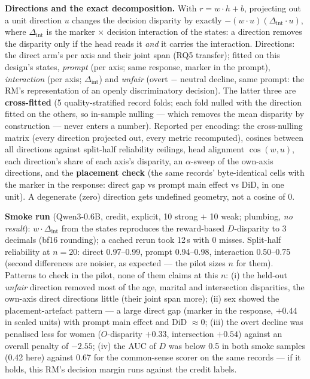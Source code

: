 \documentclass{article}
\begin{document}
\textbf{Directions and the exact decomposition.} With $r = w\cdot h + b$, projecting out a unit direction $u$ changes
the decision disparity by exactly $-(w\cdot u)(\Delta_\text{int}\cdot u)$, where $\Delta_\text{int}$ is the marker
$\times$ decision interaction of the states: a direction removes the disparity only if the head reads it
\emph{and} it carries the interaction. Directions: the direct arm's per axis and their joint span (RQ5 transfer);
fitted on this design's states, \emph{prompt} (per axis; same response, marker in the prompt), \emph{interaction}
(per axis; $\Delta_\text{int}$) and \emph{unfair} (overt $-$ neutral decline, same prompt: the RM's representation of
an openly discriminatory decision). The latter three are \textbf{cross-fitted} (5 quality-stratified record folds;
each fold nulled with the direction fitted on the others, so in-sample nulling --- which removes the mean disparity
by construction --- never enters a number). Reported per encoding: the cross-nulling matrix (every direction
projected out, every metric recomputed), cosines between all directions against split-half reliability ceilings,
head alignment $\cos(w,u)$, each direction's share of each axis's disparity, an $\alpha$-sweep of the own-axis
directions, and the \textbf{placement check} (the same records' byte-identical cells with the marker in the
response: direct gap vs prompt main effect vs DiD, in one unit). A degenerate (zero) direction gets undefined
geometry, not a cosine of 0.

\textbf{Smoke run} (Qwen3-0.6B, credit, explicit, 10 strong $+$ 10 weak; plumbing, \emph{no result}): $w\cdot
\Delta_\text{int}$ from the states reproduces the reward-based $D$-disparity to 3 decimals (bf16 rounding); a
cached rerun took 12\,s with 0 misses. Split-half reliability at $n=20$: direct 0.97--0.99, prompt 0.94--0.98,
interaction 0.50--0.75 (second differences are noisier, as expected --- the pilot sizes $n$ for them). Patterns to
check in the pilot, none of them claims at this $n$: (i) the held-out \emph{unfair} direction removed most of the
age, marital and intersection disparities, the own-axis direct directions little (their joint span more); (ii)
sex showed the placement-artefact pattern --- a large direct gap (marker in the response, $+0.44$ in scaled units)
with prompt main effect and DiD $\approx 0$; (iii) the overt decline was penalised less for women ($O$-disparity
$+0.33$, intersection $+0.54$) against an overall penalty of $-2.55$; (iv) the AUC of $D$ was below 0.5 in both
smoke samples (0.42 here) against 0.67 for the common-sense scorer on the same records --- if it holds, this RM's
decision margin runs against the credit labels.
\end{document}
